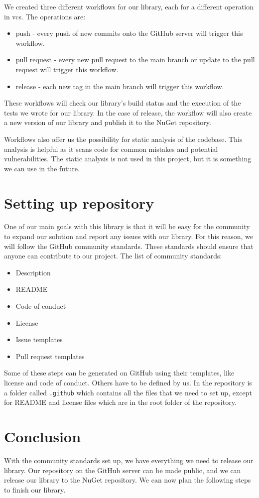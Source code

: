 We created three different workflows for our library, each for a different operation in \acrshort{vcs}. The operations are:
\begin{itemize}
    \item push - every push of new commits onto the GitHub server will trigger this workflow.
    \item pull request - every new pull request to the main branch or update to the pull request will trigger this workflow.
    \item release - each new tag in the main branch will trigger this workflow.
\end{itemize}
These workflows will check our library's build status and the execution of the tests we wrote for our library.
In the case of release, the workflow will also create a new version of our library and publish it to the NuGet repository.

Workflows also offer us the possibility for static analysis of the codebase. This analysis is helpful as it scans code for common mistakes and potential vulnerabilities.
The static analysis is not used in this project, but it is something we can use in the future.

\section{Setting up repository}

One of our main goals with this library is that it will be easy for the community to expand our solution and report any issues with our library.
For this reason, we will follow the GitHub community standards. These standards should ensure that anyone can contribute to our project.
The list of community standards:
\begin{itemize}
    \item {Description}
    \item {README}
    \item {Code of conduct}
    \item {License}
    \item {Issue templates}
    \item {Pull request templates}
\end{itemize}

Some of these steps can be generated on GitHub using their templates, like license and code of conduct.
Others have to be defined by us. In the repository is a folder called \texttt{.github} which contains all the files that we need to set up, except for README and license files which are in the root folder of the repository.

\section{Conclusion}

With the community standards set up, we have everything we need to release our library.
Our repository on the GitHub server can be made public, and we can release our library to the NuGet repository.
We can now plan the following steps to finish our library.
